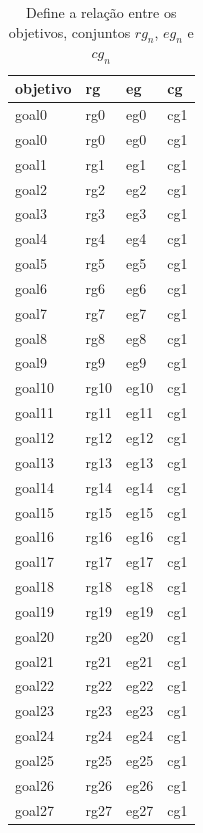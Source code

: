 \documentclass[12pt]{article}
\begin{document}
		
\begin{table}[H]
\centering
{}
\begin{tabular}{|l|l|l|l|}
\hline
\textbf{objetivo}  & \textbf{rg} & \textbf{eg} & \textbf{cg} \\ \hline
goal0 & rg0 & eg0 & cg1 \\ \hline
goal0 & rg0 & eg0 & cg1 \\ \hline
goal1 & rg1 & eg1 & cg1 \\ \hline
goal2 & rg2 & eg2 & cg1 \\ \hline
goal3 & rg3 & eg3 & cg1 \\ \hline
goal4 & rg4 & eg4 & cg1 \\ \hline
goal5 & rg5 & eg5 & cg1 \\ \hline
goal6 & rg6 & eg6 & cg1 \\ \hline
goal7 & rg7 & eg7 & cg1 \\ \hline
goal8 & rg8 & eg8 & cg1 \\ \hline
goal9 & rg9 & eg9 & cg1 \\ \hline
goal10 & rg10 & eg10 & cg1 \\ \hline
goal11 & rg11 & eg11 & cg1 \\ \hline
goal12 & rg12 & eg12 & cg1 \\ \hline
goal13 & rg13 & eg13 & cg1 \\ \hline
goal14 & rg14 & eg14 & cg1 \\ \hline
goal15 & rg15 & eg15 & cg1 \\ \hline
goal16 & rg16 & eg16 & cg1 \\ \hline
goal17 & rg17 & eg17 & cg1 \\ \hline
goal18 & rg18 & eg18 & cg1 \\ \hline
goal19 & rg19 & eg19 & cg1 \\ \hline
goal20 & rg20 & eg20 & cg1 \\ \hline
goal21 & rg21 & eg21 & cg1 \\ \hline
goal22 & rg22 & eg22 & cg1 \\ \hline
goal23 & rg23 & eg23 & cg1 \\ \hline
goal24 & rg24 & eg24 & cg1 \\ \hline
goal25 & rg25 & eg25 & cg1 \\ \hline
goal26 & rg26 & eg26 & cg1 \\ \hline
goal27 & rg27 & eg27 & cg1 \\ \hline
\end{tabular}
\caption{Define a relação entre os objetivos, conjuntos $rg_n$, $eg_n$ e $cg_n$ }
\label{goalsrelationsentity}
\end{table}
\end{document}
